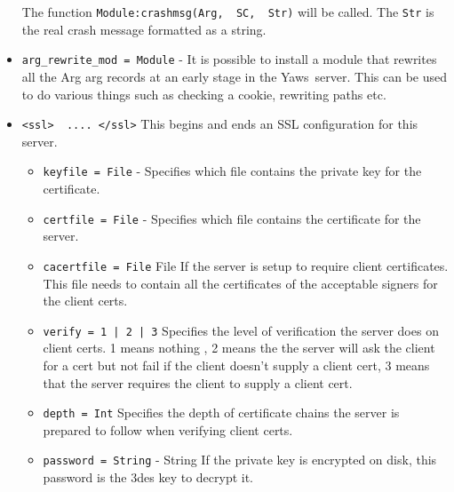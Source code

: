 \documentclass[11pt,oneside,english]{book}
\newcommand{\Yaws}            %
        {{\sc Yaws}}
\begin{document}
\begin{itemize}
              The function \verb+Module:crashmsg(Arg,  SC,  Str)+
              will  be  called.  The \verb+Str+ is the real crash
              message formatted as a string.

\item       \verb+arg_rewrite_mod = Module+ -
              It is possible  to  install  a  module  that
              rewrites  all  the  Arg arg{} records at an
              early stage in the \Yaws\  server.  This can be
              used to do various things such as checking a
              cookie, rewriting paths etc.


\item        \verb+<ssl>  .... </ssl>+
              This begins and ends  an  SSL  configuration
              for this server.
\begin{itemize}
\item        \verb+keyfile = File+ -
              Specifies  which  file  contains the private
              key for the certificate.

\item        \verb+certfile = File+ -
              Specifies which file contains  the  certificate for the server.

\item        \verb+cacertfile = File+
              File  If  the  server  is  setup  to require
              client certificates. This file needs to contain
              all the certificates of the acceptable
              signers for the client certs.

\item        \verb+verify = 1 | 2 | 3+
              Specifies  the  level  of  verification  the
              server  does  on client certs. 1 means nothing
              , 2 means the the  server  will  ask  the
              client for a cert but not fail if the client
              doesn't supply a client cert, 3  means  that
              the  server  requires the client to supply a
              client cert.

\item        \verb+depth = Int+
              Specifies the depth  of  certificate  chains
              the  server is prepared to follow when verifying
              client certs.

\item        \verb+password = String+ -
              String If the private key  is  encrypted  on
              disk,  this  password  is  the  3des  key to
              decrypt it.


\end{itemize}
\end{itemize}
\end{document}
